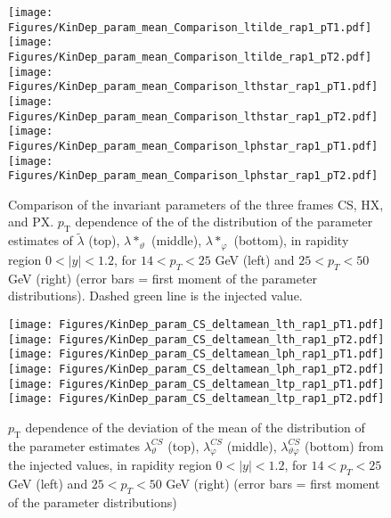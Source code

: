 \documentclass[12pt]{article}
\newcommand{\pT}{p_\mathrm{T}}
\newcommand{\absy}{\left |  y \right |}
\newcommand{\lamtilde}{\tilde{\lambda}}
\newcommand{\lamthstar}{\lambda*_\vartheta}
\newcommand{\lamphstar}{\lambda*_\varphi}
\newcommand{\lamthCS}{\lambda^{\scriptscriptstyle CS}_\vartheta}
\newcommand{\lamphCS}{\lambda^{\scriptscriptstyle CS}_\varphi}
\newcommand{\lamthphCS}{\lambda^{\scriptscriptstyle CS}_{\vartheta \varphi}}
\begin{document}




\begin{figure}[htbp]
\centering
\texttt{[image: Figures/KinDep\_param\_mean\_Comparison\_ltilde\_rap1\_pT1.pdf]}
\texttt{[image: Figures/KinDep\_param\_mean\_Comparison\_ltilde\_rap1\_pT2.pdf]}
\texttt{[image: Figures/KinDep\_param\_mean\_Comparison\_lthstar\_rap1\_pT1.pdf]}
\texttt{[image: Figures/KinDep\_param\_mean\_Comparison\_lthstar\_rap1\_pT2.pdf]}
\texttt{[image: Figures/KinDep\_param\_mean\_Comparison\_lphstar\_rap1\_pT1.pdf]}
\texttt{[image: Figures/KinDep\_param\_mean\_Comparison\_lphstar\_rap1\_pT2.pdf]}
\caption{Comparison of the invariant parameters of the three frames CS, HX,
and PX. $\pT$ dependence of the of the distribution of the
parameter estimates of $\lamtilde$ (top), $\lamthstar$ (middle), $\lamphstar$ (bottom), in rapidity region $0<\absy<1.2$, for $14 < p_T < 25$ GeV (left) and
$25 < p_T < 50$ GeV (right) (error bars = first moment of the parameter
distributions). Dashed green line is the injected value.}
\end{figure}
\clearpage











\begin{figure}[htbp]
\centering
\texttt{[image: Figures/KinDep\_param\_CS\_deltamean\_lth\_rap1\_pT1.pdf]}
\texttt{[image: Figures/KinDep\_param\_CS\_deltamean\_lth\_rap1\_pT2.pdf]}
\texttt{[image: Figures/KinDep\_param\_CS\_deltamean\_lph\_rap1\_pT1.pdf]}
\texttt{[image: Figures/KinDep\_param\_CS\_deltamean\_lph\_rap1\_pT2.pdf]}
\texttt{[image: Figures/KinDep\_param\_CS\_deltamean\_ltp\_rap1\_pT1.pdf]}
\texttt{[image: Figures/KinDep\_param\_CS\_deltamean\_ltp\_rap1\_pT2.pdf]}
\caption{$\pT$ dependence of the deviation of the mean of the distribution of
the parameter estimates $\lamthCS$ (top), $\lamphCS$ (middle), $\lamthphCS$
(bottom) from the injected values, in rapidity region $0<\absy<1.2$, for $14 < p_T < 25$ GeV (left) and
$25 < p_T < 50$ GeV (right) (error bars = first moment of the parameter
distributions)}
\end{figure}
\clearpage
\end{document}
